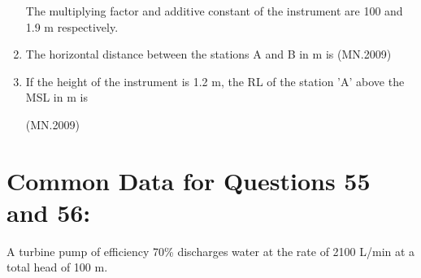 \documentclass[journal]{IEEEtran}
\numberwithin{equation}{enumi}
\numberwithin{figure}{enumi}
\begin{document}
\begin{enumerate}
The multiplying factor and additive constant of the instrument are 100 and 1.9 m respectively.

\item The horizontal distance between the stations A and B in m is
\hfill{(MN.2009)}
\begin{enumerate}[label=(\Alph*)]
\end{enumerate}

\item If the height of the instrument is 1.2 m, the RL of the station 'A' above the MSL in m is%

\hfill{(MN.2009)}
\begin{enumerate}[label=(\Alph*)]
\end{enumerate}

\end{enumerate}

\section*{Common Data for Questions 55 and 56:}

A turbine pump of efficiency 70\% discharges water at the rate of 2100 L/min at a total head of 100 m.
\end{document}
